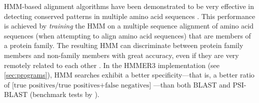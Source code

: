 
HMM-based alignment algorithms have been demonstrated to be very effective in
detecting conserved patterns in multiple amino acid sequences \citep{eddy1995,
hughey1996}.  This performance is achieved by \emph{training} the HMM on a
multiple sequence alignment of amino acid sequences (when attempting to align
amino acid sequences) that are members of a protein family. The resulting HMM
can discriminate between protein family members and non-family members with
great accuracy, even if they are very remotely related to each other
\citep{karplus1998}. In the HMMER3 implementation (see \autoref{sec:programs}),
HMM searches exhibit a better specificity---that is, a better ratio of
$\textrm{[true positives/true positives+false negatives]}$
\citep{korf2004}---than both BLAST \citep{altschul1990} and PSI-BLAST
\citep{altschul1997} (benchmark tests by \citet{eddy2009}).

